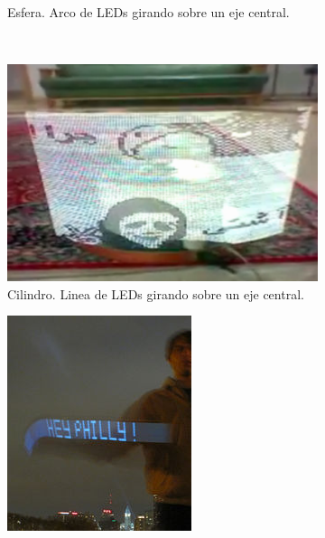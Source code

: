 \begin{figure}[!p]
\begin{subfigure}[t]{0.3\textwidth}
		\caption{Esfera. Arco de LEDs girando sobre un eje central.}
		\label{fig:sphere}
	\end{subfigure}
	\\
	\begin{subfigure}[t]{0.3\textwidth}
		\centering
		\includegraphics[width=\textwidth]{images/cylinder}
		\caption{Cilindro. Linea de LEDs girando sobre un eje central.}
		\label{fig:cylinder}
	\end{subfigure}
	\hspace{0.5cm}
	\begin{subfigure}[t]{0.3\textwidth}
		\centering
		\includegraphics[width=\textwidth]{images/handPOV}

\end{subfigure}
\end{figure}
